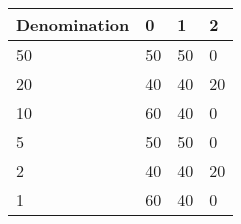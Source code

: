 \begin{tabular}{llll}
Denomination & 0 & 1 & 2 \\ 
\hline 
50 & 50 & 50 & 0 \\ 
20 & 40 & 40 & 20 \\ 
10 & 60 & 40 & 0 \\ 
5 & 50 & 50 & 0 \\ 
2 & 40 & 40 & 20 \\ 
1 & 60 & 40 & 0 \\ 
\hline 
\end{tabular}